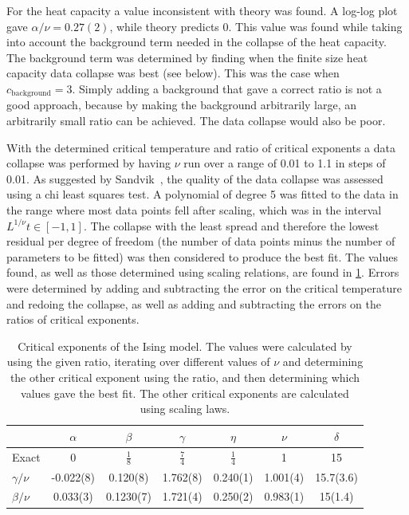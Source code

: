\documentclass[11pt, a4paper]{report} %
\begin{document}
For the heat capacity a value inconsistent with theory was found.
A log-log plot gave \(\alpha /\nu = 0.27(2)\), while theory predicts 0.
This value was found while taking into account the background term needed in the collapse of the heat capacity.
The background term was determined by finding when the finite size heat capacity data collapse was best (see below). This was the case when \(c_{\mathrm{background}} = 3\).
Simply adding a background that gave a correct ratio is not a good approach, because by making the background arbitrarily large, an arbitrarily small ratio can be achieved.
The data collapse would also be poor.

With the determined critical temperature and ratio of critical exponents a data collapse was performed by having \(\nu\) run over a range of 0.01 to 1.1 in steps of 0.01.
As suggested by Sandvik~\cite{sandvik:2011}, the quality of the data collapse was assessed using a chi least squares test.
A polynomial of degree 5 was fitted to the data in the range where most data points fell after scaling, which was in the interval \(L^{1/\nu}t \in [-1, 1]\).
The collapse with the least spread and therefore the lowest residual per degree of freedom (the number of data points minus the number of parameters to be fitted) was then considered to produce the best fit.
The values found, as well as those determined using scaling relations, are found in \cref{tab:ising_critical_exponents}.
Errors were determined by adding and subtracting the error on the critical temperature and redoing the collapse, as well as adding and subtracting the errors on the ratios of critical exponents.

\begin{table}[htb]
	\centering
	\renewcommand{\arraystretch}{1.5}
	\begin{tabular}{l | c c c c c c}
		\hline
		& \(\alpha\) & \(\beta\) & \(\gamma\) & \(\eta\) & \(\nu\) & \(\delta\) \\\hline
		Exact & 0 & \(\frac{1}{8}\) & \(\frac{7}{4}\) & \(\frac{1}{4}\) & 1 & 15 \\
		\(\gamma/\nu\) & -0.022(8) & 0.120(8) & 1.762(8) & 0.240(1) & 1.001(4) & 15.7(3.6) \\
		\(\beta/\nu\) & 0.033(3) & 0.1230(7) & 1.721(4) & 0.250(2) & 0.983(1) & 15(1.4)\\\hline
	\end{tabular}
	\caption{Critical exponents of the Ising model. The values were calculated by using the given ratio, iterating over different values of \(\nu\) and determining the other critical exponent using the ratio, and then determining which values gave the best fit. The other critical exponents are calculated using scaling laws.}
	\label{tab:ising_critical_exponents}
\end{table}
\end{document}
